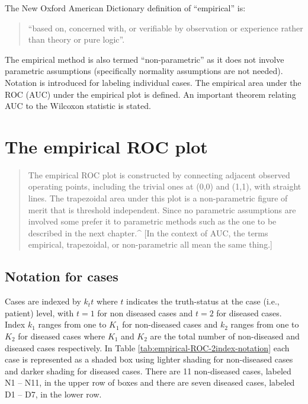 \documentclass[
]{book}
\begin{document}
The New Oxford American Dictionary definition of ``empirical'' is:

\begin{quote}
``based on, concerned with, or verifiable by observation or experience rather than theory or pure logic''.
\end{quote}

The empirical method is also termed ``non-parametric'' as it does not involve parametric assumptions (specifically normality assumptions are not needed). Notation is introduced for labeling individual cases. The empirical area under the ROC (AUC) under the empirical plot is defined. An important theorem relating AUC to the Wilcoxon statistic is stated.

\hypertarget{empirical-roc-plot}{%
\section{The empirical ROC plot}\label{empirical-roc-plot}}

\begin{quote}
The empirical ROC plot is constructed by connecting adjacent observed operating points, including the trivial ones at (0,0) and (1,1), with straight lines. The trapezoidal area under this plot is a non-parametric figure of merit that is threshold independent. Since no parametric assumptions are involved some prefer it to parametric methods such as the one to be described in the next chapter.\^{} {[}In the context of AUC, the terms empirical, trapezoidal, or non-parametric all mean the same thing.{]}
\end{quote}

\hypertarget{notation-for-cases}{%
\subsection{Notation for cases}\label{notation-for-cases}}

Cases are indexed by \(k_tt\) where \(t\) indicates the truth-status at the case (i.e., patient) level, with \(t=1\) for non diseased cases and \(t=2\) for diseased cases. Index \(k_1\) ranges from one to \(K_1\) for non-diseased cases and \(k_2\) ranges from one to \(K_2\) for diseased cases where \(K_1\) and \(K_2\) are the total number of non-diseased and diseased cases respectively. In Table \ref{tab:empirical-ROC-2index-notation} each case is represented as a shaded box using lighter shading for non-diseased cases and darker shading for diseased cases. There are 11 non-diseased cases, labeled N1 -- N11, in the upper row of boxes and there are seven diseased cases, labeled D1 -- D7, in the lower row.
\end{document}
